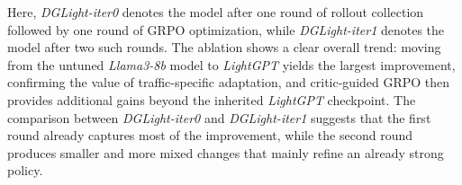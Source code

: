Here, \textit{DGLight-iter0} denotes the model after one round of rollout collection followed by one round of GRPO optimization, while \textit{DGLight-iter1} denotes the model after two such rounds. The ablation shows a clear overall trend: moving from the untuned \textit{Llama3-8b} model to \textit{LightGPT} yields the largest improvement, confirming the value of traffic-specific adaptation, and critic-guided GRPO then provides additional gains beyond the inherited \textit{LightGPT} checkpoint. The comparison between \textit{DGLight-iter0} and \textit{DGLight-iter1} suggests that the first round already captures most of the improvement, while the second round produces smaller and more mixed changes that mainly refine an already strong policy.
